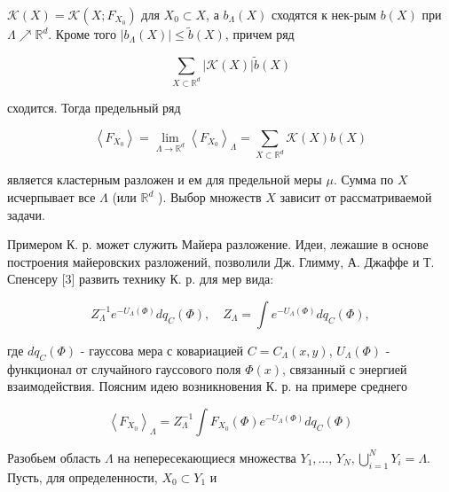 \documentclass[10pt]{article}
\begin{document}
$\mathscr{K}(X)=\mathscr{K}\left(X ; F_{X_{0}}\right)$ для $X_{0} \subset X$, а $b_{\Lambda}(X)$ сходятся к нек-рым $b(X)$ при $\Lambda \nearrow \mathbb{R}^{d}$. Кроме того $\left|b_{\Lambda}(X)\right| \leqslant \tilde{b}(X)$, причем ряд



\[

\sum_{X \subset \mathbb{R}^{d}}|\mathcal{K}(X)| \tilde{b}(X)

\]



сходится. Тогда предельный ряд



\[

\left\langle F_{X_{0}}\right\rangle=\lim _{\Lambda \rightarrow \mathbb{R}^{d}}\left\langle F_{X_{0}}\right\rangle_{\Lambda}=\sum_{X \subset \mathbb{R}^{d}} \mathscr{K}(X) b(X)

\]



является кластерным разложен и ем для предельной меры $\mu$. Сумма по $X$ исчерпывает все $\Lambda$ (или $\mathbb{R}^{d}$ ). Выбор множеств $X$ зависит от рассматриваемой задачи.



Примером К. р. может служить Майера разложение. Идеи, лежашие в основе построения майеровских разложений, позволили Дж. Глимму, А. Джаффе и Т. Спенсеру [3] развить технику К. р. для мер вида:



\[

Z_{\Lambda}^{-1} e^{-U_{\Lambda}(\Phi)} d q_{C}(\Phi), \quad Z_{\Lambda}=\int e^{-U_{\Lambda}(\Phi)} d q_{C}(\Phi),

\]



где $d q_{C}(\Phi)$ - гауссова мера с ковариацией $C=C_{\Lambda}(x, y)$, $U_{\Lambda}(\Phi)$ - функционал от случайного гауссового поля $\Phi(x)$, связанный с энергией взаимодействия. Поясним идею возникновения К. р. на примере среднего



\[

\left\langle F_{X_{0}}\right\rangle_{\Lambda}=Z_{\Lambda}^{-1} \int F_{X_{0}}(\Phi) e^{-U_{\Lambda}(\Phi)} d q_{C}(\Phi)

\]



Разобьем область $\Lambda$ на непересекающиеся множества $Y_{1}, \ldots$, $Y_{N}, \bigcup_{i=1}^{N} Y_{i}=\Lambda$. Пусть, для определенности, $X_{0} \subset Y_{1}$ и
\end{document}
